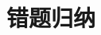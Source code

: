 \documentclass[../../main.tex]{subfiles}
\begin{document}
\section{错题归纳}


\qone %
\qtwo %
\end{document}
